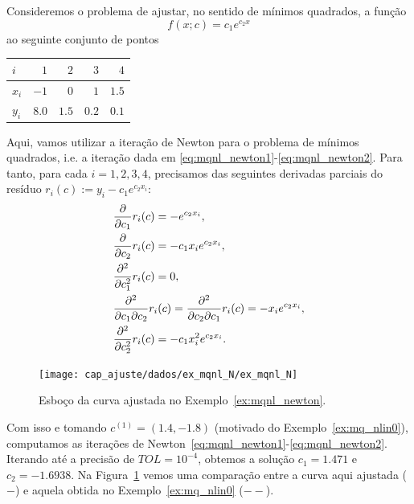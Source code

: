 \begin{ex}\label{ex:mqnl_newton}
  Consideremos o problema de ajustar, no sentido de mínimos quadrados, a função
  \begin{equation}
    f(x;c) = c_1e^{c_2x}
  \end{equation}
ao seguinte conjunto de pontos
\begin{center}
  \begin{tabular}{l|rrrr}
    $i$ & $1$ & $2$ & $3$ & $4$ \\\hline
    $x_i$ & $-1$ & $0$ & $1$ & $1.5$\\
    $y_i$ & $8.0$ & $1.5$ & $0.2$ & $0.1$\\\hline
  \end{tabular}
\end{center}

Aqui, vamos utilizar a iteração de Newton para o problema de mínimos quadrados, i.e. a iteração dada em \eqref{eq:mqnl_newton1}-\eqref{eq:mqnl_newton2}. Para tanto, para cada $i=1, 2, 3, 4$, precisamos das seguintes derivadas parciais do resíduo $r_i(c) := y_i - c_1e^{c_2x_i}$:
\begin{align}
  &\frac{\partial}{\partial c_1}r_i(c) = - e^{c_2x_i},\\
  &\frac{\partial}{\partial c_2}r_i(c) = - c_1x_ie^{c_2x_i},\\
  &\frac{\partial^2}{\partial c_1^2}r_i(c) = 0,\\
  &\frac{\partial^2}{\partial c_1\partial c_2}r_i(c) = \frac{\partial^2}{\partial c_2\partial c_1}r_i(c) = - x_ie^{c_2x_i},\\
  &\frac{\partial^2}{\partial c_2^2}r_i(c) = - c_1x_i^2e^{c_2x_i}.
\end{align}

\begin{figure}[h]
  \centering
  \texttt{[image: cap\_ajuste/dados/ex\_mqnl\_N/ex\_mqnl\_N]}
  \caption{Esboço da curva ajustada no Exemplo~\ref{ex:mqnl_newton}.}
  \label{fig:ex_mqnl_newton}
\end{figure}

Com isso e tomando $c^{(1)} = (1.4,  -1.8)$ (motivado do Exemplo~\ref{ex:mq_nlin0}), computamos as iterações de Newton~\eqref{eq:mqnl_newton1}-\eqref{eq:mqnl_newton2}. Iterando até a precisão de $TOL = 10^{-4}$, obtemos a solução $c_1 = 1.471$ e $c_2 = -1.6938$. Na Figura~\ref{fig:ex_mqnl_newton} vemos uma comparação entre a curva aqui ajustada ($-$) e aquela obtida no Exemplo~\ref{ex:mq_nlin0} ($--$).



\end{ex}
